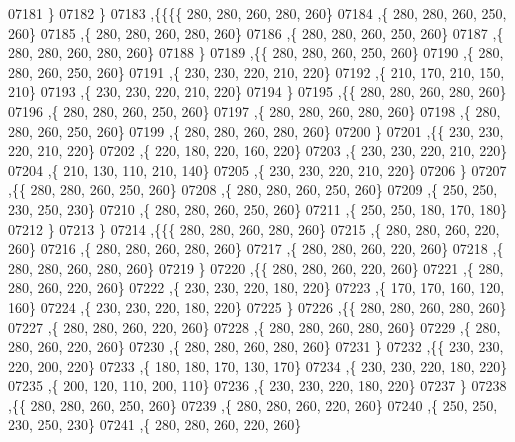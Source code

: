\begin{DoxyCode}
07181    \}
07182   \}
07183  ,\{\{\{\{   280,   280,   260,   280,   260\}
07184     ,\{   280,   280,   260,   250,   260\}
07185     ,\{   280,   280,   260,   280,   260\}
07186     ,\{   280,   280,   260,   250,   260\}
07187     ,\{   280,   280,   260,   280,   260\}
07188     \}
07189    ,\{\{   280,   280,   260,   250,   260\}
07190     ,\{   280,   280,   260,   250,   260\}
07191     ,\{   230,   230,   220,   210,   220\}
07192     ,\{   210,   170,   210,   150,   210\}
07193     ,\{   230,   230,   220,   210,   220\}
07194     \}
07195    ,\{\{   280,   280,   260,   280,   260\}
07196     ,\{   280,   280,   260,   250,   260\}
07197     ,\{   280,   280,   260,   280,   260\}
07198     ,\{   280,   280,   260,   250,   260\}
07199     ,\{   280,   280,   260,   280,   260\}
07200     \}
07201    ,\{\{   230,   230,   220,   210,   220\}
07202     ,\{   220,   180,   220,   160,   220\}
07203     ,\{   230,   230,   220,   210,   220\}
07204     ,\{   210,   130,   110,   210,   140\}
07205     ,\{   230,   230,   220,   210,   220\}
07206     \}
07207    ,\{\{   280,   280,   260,   250,   260\}
07208     ,\{   280,   280,   260,   250,   260\}
07209     ,\{   250,   250,   230,   250,   230\}
07210     ,\{   280,   280,   260,   250,   260\}
07211     ,\{   250,   250,   180,   170,   180\}
07212     \}
07213    \}
07214   ,\{\{\{   280,   280,   260,   280,   260\}
07215     ,\{   280,   280,   260,   220,   260\}
07216     ,\{   280,   280,   260,   280,   260\}
07217     ,\{   280,   280,   260,   220,   260\}
07218     ,\{   280,   280,   260,   280,   260\}
07219     \}
07220    ,\{\{   280,   280,   260,   220,   260\}
07221     ,\{   280,   280,   260,   220,   260\}
07222     ,\{   230,   230,   220,   180,   220\}
07223     ,\{   170,   170,   160,   120,   160\}
07224     ,\{   230,   230,   220,   180,   220\}
07225     \}
07226    ,\{\{   280,   280,   260,   280,   260\}
07227     ,\{   280,   280,   260,   220,   260\}
07228     ,\{   280,   280,   260,   280,   260\}
07229     ,\{   280,   280,   260,   220,   260\}
07230     ,\{   280,   280,   260,   280,   260\}
07231     \}
07232    ,\{\{   230,   230,   220,   200,   220\}
07233     ,\{   180,   180,   170,   130,   170\}
07234     ,\{   230,   230,   220,   180,   220\}
07235     ,\{   200,   120,   110,   200,   110\}
07236     ,\{   230,   230,   220,   180,   220\}
07237     \}
07238    ,\{\{   280,   280,   260,   250,   260\}
07239     ,\{   280,   280,   260,   220,   260\}
07240     ,\{   250,   250,   230,   250,   230\}
07241     ,\{   280,   280,   260,   220,   260\}

\end{DoxyCode}
